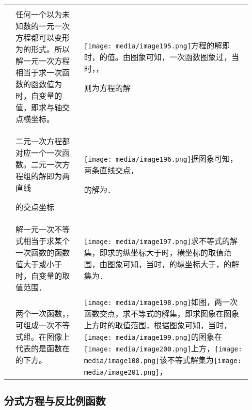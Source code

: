 \documentclass[a4paper,11pt,UTF8]{ctexart}
\begin{document}
\begin{longtable}[]{@{}lll@{}}
\toprule
\endhead
& &\tabularnewline
\begin{minipage}[t]{0.30\columnwidth}\raggedright
\strut
\end{minipage} & \begin{minipage}[t]{0.30\columnwidth}\raggedright
任何一个以为未知数的一元一次方程都可以变形为的形式。所以解一元一次方程相当于求一次函数的函数值为时，自变量的值，即求与轴交点横坐标。\strut
\end{minipage} & \begin{minipage}[t]{0.30\columnwidth}\raggedright
\texttt{[image: media/image195.png]}方程的解即时，的值。由图象可知，一次函数图象过，当时，，

则为方程的解\strut
\end{minipage}\tabularnewline
\begin{minipage}[t]{0.30\columnwidth}\raggedright
\strut
\end{minipage} & \begin{minipage}[t]{0.30\columnwidth}\raggedright
二元一次方程都对应一个一次函数。二元一次方程组的解即为两直线

的交点坐标\strut
\end{minipage} & \begin{minipage}[t]{0.30\columnwidth}\raggedright
\texttt{[image: media/image196.png]}据图象可知，两条直线交点，

的解为．\strut
\end{minipage}\tabularnewline
&
解一元一次不等式相当于求某个一次函数的函数值大于或小于时，自变量的取值范围．
&
\texttt{[image: media/image197.png]}求不等式的解集，即求的纵坐标大于时，横坐标的取值范围，由图象可知，当时，的纵坐标大于，的解集为．\tabularnewline
& 两个一次函数，，可组成一次不等式组。在图像上代表的是函数在的下方。 &
\texttt{[image: media/image198.png]}如图，两一次函数交点，求不等式的解集，即求图象在图象上方时的取值范围，根据图象可知，当时，\texttt{[image: media/image199.png]}的图象在\texttt{[image: media/image200.png]}上方，\texttt{[image: media/image108.png]}该不等式解集为\texttt{[image: media/image201.png]}，\tabularnewline
\bottomrule
\end{longtable}

\hypertarget{ux5206ux5f0fux65b9ux7a0bux4e0eux53cdux6bd4ux4f8bux51fdux6570}{%
\subsection{\texorpdfstring{
分式方程与反比例函数}{ 分式方程与反比例函数}}\label{ux5206ux5f0fux65b9ux7a0bux4e0eux53cdux6bd4ux4f8bux51fdux6570}}
\end{document}
